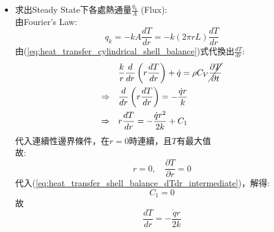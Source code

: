 \documentclass[../main.tex]{subfiles}
\begin{document}
\begin{itemize}
\begin{itemize}
\begin{align}
    (\div dr)\quad& \frac{
      k\left[2\pi (r+dr) L\right]\frac{dT}{dr}\bigg|_{r+dr} - k\left(2\pi r L\right)\frac{dT}{dr}\bigg|_r
    }{dr} + \dot q (2\pi r L) = \rho C_V (2\pi r L) \frac{\partial T}{\partial t} \nonumber\\
    (\lim_{dr\to 0})\quad& -k \frac{d}{dr}\left(2\pi r L \frac{dT}{dr}\right) + \dot q (2\pi r L) = \rho C_V (2\pi r L) \frac{\partial T}{\partial t} \nonumber\\
    \Rightarrow\quad& \boxed{
      \frac{k}{r} \frac{d}{dr}\left(r \frac{dT}{dr}\right) + \dot q = \rho C_V \frac{\partial T}{\partial t}
    }  \label{eq:heat_transfer_cylindrical_shell_balance}
    \end{align}
    P.S. $\frac{k}{r} \frac{d}{dr}\left(r \frac{dT}{dr}\right)$ 就是圓柱座標的Laplace:
    \begin{equation}
      k\nabla^2 T = \frac{k}{r} \frac{d}{dr}\left(r \frac{dT}{dr}\right)
    \end{equation}
    \item 求出Steady State下各處熱通量$\frac{q_k}{A}$ (Flux):\\
    由Fourier's Law:
    \begin{equation}
      q_k = -kA\frac{dT}{dr} = -k(2\pi r L)\frac{dT}{dr} \label{eq:heat_transfer_shell_balance_Fourier_law}
    \end{equation}
    由(\ref{eq:heat_transfer_cylindrical_shell_balance})式代換出$\frac{dT}{dr}$:
    \begin{align}
      & \frac{k}{r} \frac{d}{dr}\left(r \frac{dT}{dr}\right) + \dot q = \rho C_V \cancel{\frac{\partial T}{\partial t}} \nonumber\\
      \Rightarrow\quad& \frac{d}{dr}\left(r \frac{dT}{dr}\right) = -\frac{\dot q r}{k} \nonumber\\
      \Rightarrow\quad& r \frac{dT}{dr} = -\frac{\dot q r^2}{2k} + C_1 \label{eq:heat_transfer_shell_balance_dTdr_intermediate}
    \end{align}
    代入連續性邊界條件，在$r=0$時連續，且$T$有最大值\\
    故:
    \begin{equation}
      r=0, \quad \frac{\partial T}{\partial r} = 0
    \end{equation}
    代入(\ref{eq:heat_transfer_shell_balance_dTdr_intermediate})，解得:
    \begin{equation}
      C_1 = 0
    \end{equation}
    故
    \begin{equation}
      \frac{dT}{dr} = -\frac{\dot q r}{2k}

\end{equation}
\end{itemize}
\end{itemize}
\end{document}
